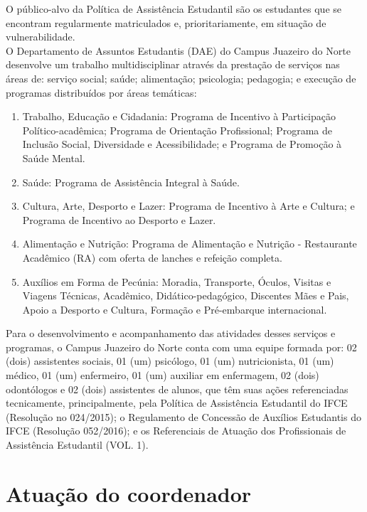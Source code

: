 O público-alvo da Política de Assistência Estudantil são os estudantes que se encontram regularmente matriculados e, prioritariamente, em situação de vulnerabilidade.\\

O Departamento de Assuntos Estudantis (DAE) do Campus Juazeiro do Norte desenvolve um trabalho multidisciplinar através da prestação de serviços nas áreas de: serviço social; saúde; alimentação; psicologia; pedagogia; e execução de programas distribuídos por áreas temáticas:

\begin{enumerate}[label=(\roman*),ref=\roman*]
\item Trabalho, Educação e Cidadania: Programa de Incentivo à Participação Político-acadêmica; Programa de Orientação Profissional; Programa de Inclusão Social, Diversidade e Acessibilidade; e Programa de Promoção à Saúde Mental.
\item  Saúde: Programa de Assistência Integral à Saúde.
\item  Cultura, Arte, Desporto e Lazer: Programa de Incentivo à Arte e Cultura; e Programa de Incentivo ao Desporto e Lazer.
\item  Alimentação e Nutrição: Programa de Alimentação e Nutrição - Restaurante Acadêmico (RA) com oferta de lanches e refeição completa.
\item  Auxílios em Forma de Pecúnia: Moradia, Transporte, Óculos, Visitas e Viagens Técnicas, Acadêmico, Didático-pedagógico, Discentes Mães e Pais, Apoio a Desporto e Cultura, Formação e Pré-embarque internacional.

\end{enumerate}

Para o desenvolvimento e acompanhamento das atividades desses serviços e programas, o Campus Juazeiro do Norte conta com uma equipe formada por: 02 (dois) assistentes sociais, 01 (um) psicólogo, 01 (um) nutricionista, 01 (um) médico, 01 (um) enfermeiro, 01 (um) auxiliar em enfermagem, 02 (dois) odontólogos e 02 (dois) assistentes de alunos, que têm suas ações referenciadas tecnicamente, principalmente, pela Política de Assistência Estudantil do IFCE (Resolução no 024/2015); o Regulamento de Concessão de Auxílios Estudantis do IFCE (Resolução 052/2016); e os Referenciais de Atuação dos Profissionais de Assistência Estudantil (VOL. 1).\\

\chapter{Atuação do coordenador}

